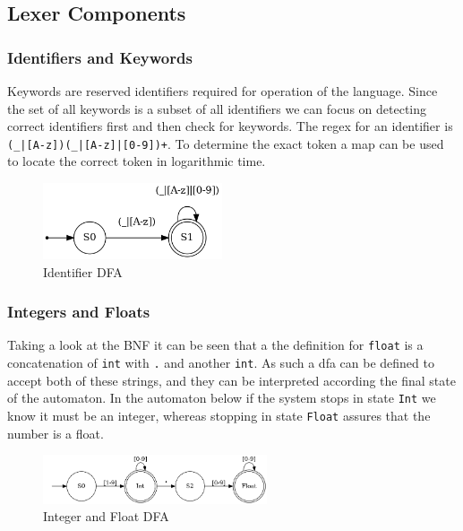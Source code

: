 \documentclass[11pt]{article}
\begin{document}
\newpage
\subsection{Lexer Components}
\label{sec:orgb58f7d7}

\subsubsection{Identifiers and Keywords}
\label{sec:org998fadd}

Keywords are reserved identifiers required for operation of the language. Since the set of all keywords is a subset of all identifiers we can focus on detecting correct identifiers first and then check for keywords. The regex for an identifier is \texttt{(\_|[A-z])(\_|[A-z]|[0-9])+}. To determine the exact token a map can be used to locate the correct token in logarithmic time.

\begin{figure}[htbp]
\centering
\includegraphics[width=200px]{automaton/identifier.png}
\caption{\label{fig:iden-dfa}Identifier DFA}
\end{figure}


\subsubsection{Integers and Floats}
\label{sec:org3e4e94f}

Taking a look at the BNF it can be seen that a the definition for \texttt{float} is a concatenation of \texttt{int} with \texttt{.} and another \texttt{int}. As such a dfa can be defined to accept both of these strings, and they can be interpreted according the final state of the automaton. In the automaton below if the system stops in state \texttt{Int} we know it must be an integer, whereas stopping in state \texttt{Float} assures that the number is a float.

\begin{figure}[htbp]
\centering
\includegraphics[width=250px]{automaton/nums.png}
\caption{\label{fig:nums-dfa}Integer and Float DFA}
\end{figure}
\end{document}
